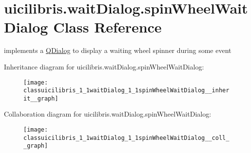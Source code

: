 \hypertarget{classuicilibris_1_1waitDialog_1_1spinWheelWaitDialog}{\section{uicilibris.\-wait\-Dialog.\-spin\-Wheel\-Wait\-Dialog \-Class \-Reference}
\label{classuicilibris_1_1waitDialog_1_1spinWheelWaitDialog}
}


implements a \hyperlink{classQDialog}{\-Q\-Dialog} to display a waiting wheel spinner during some event  




\-Inheritance diagram for uicilibris.\-wait\-Dialog.\-spin\-Wheel\-Wait\-Dialog\-:
\nopagebreak
\begin{figure}[H]
\begin{center}
\leavevmode
\texttt{[image: classuicilibris\_1\_1waitDialog\_1\_1spinWheelWaitDialog\_\_inherit\_\_graph]}
\end{center}
\end{figure}


\-Collaboration diagram for uicilibris.\-wait\-Dialog.\-spin\-Wheel\-Wait\-Dialog\-:
\nopagebreak
\begin{figure}[H]
\begin{center}
\leavevmode
\texttt{[image: classuicilibris\_1\_1waitDialog\_1\_1spinWheelWaitDialog\_\_coll\_\_graph]}
\end{center}
\end{figure}
